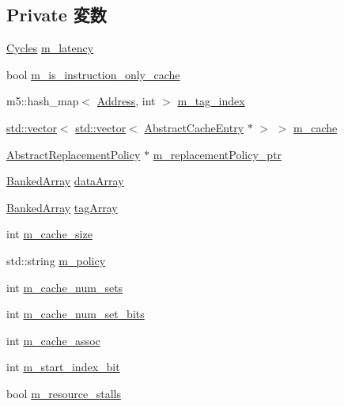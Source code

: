 \subsection*{Private 変数}
\begin{DoxyCompactItemize}
\item 
\hyperlink{classCycles}{Cycles} \hyperlink{classCacheMemory_a7599697a6c831356525c7d97604edd31}{m\_\-latency}
\item 
bool \hyperlink{classCacheMemory_a0c3e90f32ef2e92b91ca006d44c12374}{m\_\-is\_\-instruction\_\-only\_\-cache}
\item 
m5::hash\_\-map$<$ \hyperlink{classAddress}{Address}, int $>$ \hyperlink{classCacheMemory_a546a29030c6970bfbc1197ae75826bc4}{m\_\-tag\_\-index}
\item 
\hyperlink{classstd_1_1vector}{std::vector}$<$ \hyperlink{classstd_1_1vector}{std::vector}$<$ \hyperlink{classAbstractCacheEntry}{AbstractCacheEntry} $\ast$ $>$ $>$ \hyperlink{classCacheMemory_a07906f5e66f388186af8b84540922dcd}{m\_\-cache}
\item 
\hyperlink{classAbstractReplacementPolicy}{AbstractReplacementPolicy} $\ast$ \hyperlink{classCacheMemory_a37cdae2a2fe6c2b1a976cf8b3ae19f18}{m\_\-replacementPolicy\_\-ptr}
\item 
\hyperlink{classBankedArray}{BankedArray} \hyperlink{classCacheMemory_a3fe8de4d2516b188e76e11c5213d8eaf}{dataArray}
\item 
\hyperlink{classBankedArray}{BankedArray} \hyperlink{classCacheMemory_a68d742104ef77f83fee4d7832cc873fe}{tagArray}
\item 
int \hyperlink{classCacheMemory_a378c30d8d9ca0215ac61ea0974082ca0}{m\_\-cache\_\-size}
\item 
std::string \hyperlink{classCacheMemory_a89cf1f810dd6f5f9da8a2d588418ec49}{m\_\-policy}
\item 
int \hyperlink{classCacheMemory_a8773f9a442fa00b24f4c65c86dcd25d6}{m\_\-cache\_\-num\_\-sets}
\item 
int \hyperlink{classCacheMemory_a6b2e7aa0964d945df6b08fbbdd316f47}{m\_\-cache\_\-num\_\-set\_\-bits}
\item 
int \hyperlink{classCacheMemory_a0dcca2db5987fbc671fc1fef4169ebed}{m\_\-cache\_\-assoc}
\item 
int \hyperlink{classCacheMemory_ab350a6d3428acab3678b17bbd2d00c4b}{m\_\-start\_\-index\_\-bit}
\item 
bool \hyperlink{classCacheMemory_aa08c2cb7bf60a80e6be95267b1060509}{m\_\-resource\_\-stalls}
\end{DoxyCompactItemize}


